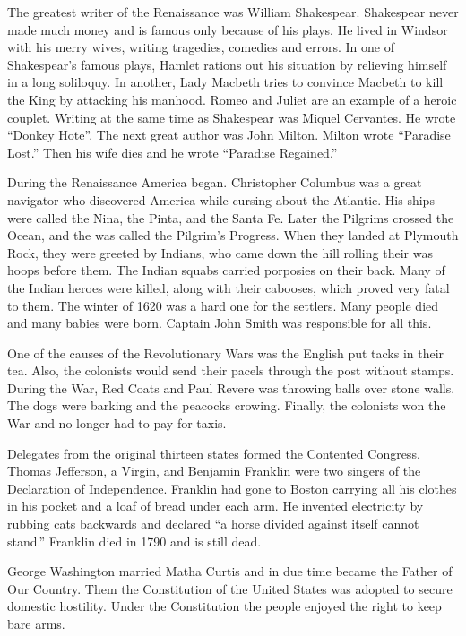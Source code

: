 The greatest writer of the Renaissance was William
Shakespear. Shakespear never made much money and is famous only
because of his plays. He lived in Windsor with his merry wives,
writing tragedies, comedies and errors. In one of Shakespear's famous
plays, Hamlet rations out his situation by relieving himself in a long
soliloquy. In another, Lady Macbeth tries to convince Macbeth to
kill the King by attacking his manhood. Romeo and Juliet are an
example of a heroic couplet. Writing at the same time as Shakespear
was Miquel Cervantes. He wrote ``Donkey Hote''. The next great author
was John Milton. Milton wrote ``Paradise Lost.'' Then his wife dies and
he wrote ``Paradise Regained.''

During the Renaissance America began. Christopher Columbus was a great
navigator who discovered America while cursing about the Atlantic. His
ships were called the Nina, the Pinta, and the Santa Fe. Later the
Pilgrims crossed the Ocean, and the was called the Pilgrim's
Progress. When they landed at Plymouth Rock, they were greeted by
Indians, who came down the hill rolling their was hoops before
them. The Indian squabs carried porposies on their back. Many of the
Indian heroes were killed, along with their cabooses, which proved
very fatal to them. The winter of 1620 was a hard one for the
settlers. Many people died and many babies were born. Captain John
Smith was responsible for all this.

One of the causes of the Revolutionary Wars was the English put tacks
in their tea. Also, the colonists would send their pacels through the
post without stamps. During the War, Red Coats and Paul Revere was
throwing balls over stone walls. The dogs were barking and the
peacocks crowing. Finally, the colonists won the War and no longer had
to pay for taxis.

Delegates from the original thirteen states formed the Contented
Congress. Thomas Jefferson, a Virgin, and Benjamin Franklin were two
singers of the Declaration of Independence. Franklin had gone to
Boston carrying all his clothes in his pocket and a loaf of bread
under each arm. He invented electricity by rubbing cats backwards
and declared ``a horse divided against itself cannot stand.'' Franklin
died in 1790 and is still dead.

George Washington married Matha Curtis and in due time became the
Father of Our Country. Them the Constitution of the United States was
adopted to secure domestic hostility. Under the Constitution the
people enjoyed the right to keep bare arms.

